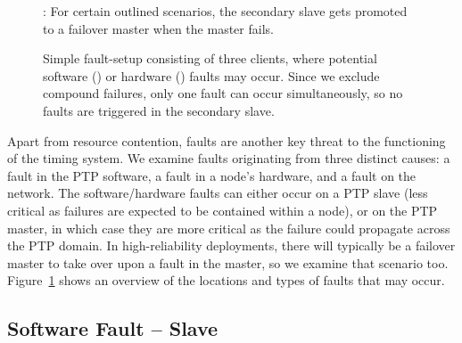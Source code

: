 \begin{figure}
    \begin{center}
    \end{center}

    \scriptsize *: For certain outlined scenarios, the secondary slave gets promoted to a failover master when the master fails.

    \caption{
        Simple fault-setup consisting of three clients, where potential software (\faBug{}) or hardware (\faBolt{}) faults may occur. Since we exclude compound failures, only one fault can occur simultaneously, so no faults are triggered in the secondary slave.
    }
    \label{fig:fault_architecture}
\end{figure}

Apart from resource contention, faults are another key threat to the functioning of the timing system. We examine faults originating from three distinct causes: a fault in the PTP software, a fault in a node's hardware, and a fault on the network. The software/hardware faults can either occur on a PTP slave (less critical as failures are expected to be contained within a node), or on the PTP master, in which case they are more critical as the failure could propagate across the PTP domain. In high-reliability deployments, there will typically be a failover master to take over upon a fault in the master, so we examine that scenario too. Figure~\ref{fig:fault_architecture} shows an overview of the locations and types of faults that may occur.

\subsection{Software Fault -- Slave}

\xdef\bSoftwareFaultNumProfiles{\cmpMax}
\newcommand{\maxClockSlew}{(0.05/100)}
\newcommand{\windowOfUncertaintyOneMinute}{(60*(\maxClockSlew))}

